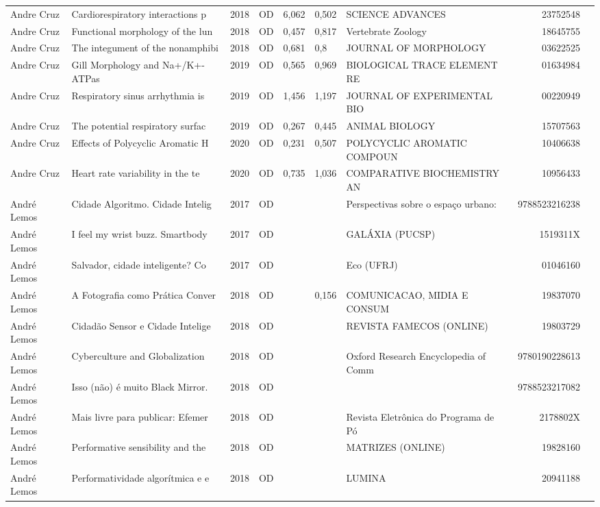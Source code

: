 \documentclass[12pt,brazil]{article}\usepackage[]{graphicx}\usepackage[]{xcolor}
\begin{document}
\begin{longtable}{lllrrllrr}
Andre Cruz & Cardiorespiratory interactions p & 2018 & OD & 6,062 & 0,502 & SCIENCE ADVANCES & 23752548 \\
Andre Cruz & Functional morphology of the lun & 2018 & OD & 0,457 & 0,817 & Vertebrate Zoology & 18645755 \\
Andre Cruz & The integument of the nonamphibi & 2018 & OD & 0,681 & 0,8 & JOURNAL OF MORPHOLOGY & 03622525 \\
Andre Cruz & Gill Morphology and Na+/K+-ATPas & 2019 & OD & 0,565 & 0,969 & BIOLOGICAL TRACE ELEMENT RE & 01634984 \\
Andre Cruz & Respiratory sinus arrhythmia is  & 2019 & OD & 1,456 & 1,197 & JOURNAL OF EXPERIMENTAL BIO & 00220949 \\
Andre Cruz & The potential respiratory surfac & 2019 & OD & 0,267 & 0,445 & ANIMAL BIOLOGY & 15707563 \\
Andre Cruz & Effects of Polycyclic Aromatic H & 2020 & OD & 0,231 & 0,507 & POLYCYCLIC AROMATIC COMPOUN & 10406638 \\
Andre Cruz & Heart rate variability in the te & 2020 & OD & 0,735 & 1,036 & COMPARATIVE BIOCHEMISTRY AN & 10956433 \\
André Lemos & Cidade Algoritmo. Cidade Intelig & 2017 & OD &  &  & Perspectivas sobre o espaço urbano:  & 9788523216238 \\
André Lemos & I feel my wrist buzz.  Smartbody & 2017 & OD &  &  & GALÁXIA (PUCSP) & 1519311X \\
André Lemos & Salvador, cidade inteligente? Co & 2017 & OD &  &  & Eco (UFRJ) & 01046160 \\
André Lemos & A Fotografia como Prática Conver & 2018 & OD &  & 0,156 & COMUNICACAO, MIDIA E CONSUM & 19837070 \\
André Lemos & Cidadão Sensor e Cidade Intelige & 2018 & OD &  &  & REVISTA FAMECOS (ONLINE) & 19803729 \\
André Lemos & Cyberculture and Globalization & 2018 & OD &  &  & Oxford Research Encyclopedia of Comm & 9780190228613 \\
André Lemos & Isso (não) é muito Black Mirror. & 2018 & OD &  &  &  & 9788523217082 \\
André Lemos & Mais livre para publicar: Efemer & 2018 & OD &  &  & Revista Eletrônica do Programa de Pó & 2178802X \\
André Lemos & Performative sensibility and the & 2018 & OD &  &  & MATRIZES (ONLINE) & 19828160 \\
André Lemos & Performatividade algorítmica e e & 2018 & OD &  &  & LUMINA & 20941188 \\

\end{longtable}
\end{document}
